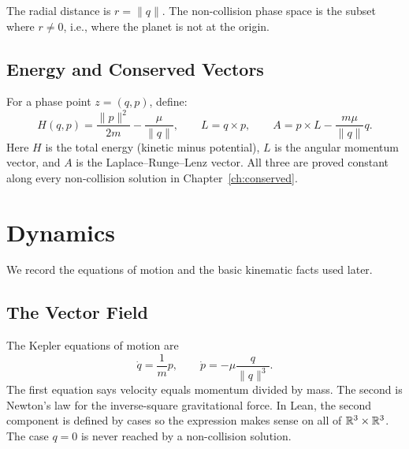 \begin{definition}\label{def:noncollision}
The radial distance is $r = \|q\|$.
The non-collision phase space is the subset where $r \neq 0$, i.e., where the planet is not at the origin.
\leanok
\end{definition}

\section{Energy and Conserved Vectors}

\begin{definition}\label{def:basic-observables}
For a phase point $z = (q, p)$, define:
\[
  H(q,p) = \frac{\|p\|^2}{2m} - \frac{\mu}{\|q\|},
  \qquad
  L = q \times p,
  \qquad
  A = p \times L - \frac{m\mu}{\|q\|}q.
\]
Here $H$ is the total energy (kinetic minus potential), $L$ is the angular momentum vector, and $A$ is the Laplace--Runge--Lenz vector.
All three are proved constant along every non-collision solution in Chapter~\ref{ch:conserved}.
\leanok
\end{definition}

\chapter{Dynamics}

We record the equations of motion and the basic kinematic facts used later.

\section{The Vector Field}

\begin{definition}\label{def:vector-field}
The Kepler equations of motion are
\[
  \dot q = \frac{1}{m}p,
  \qquad
  \dot p = -\mu\frac{q}{\|q\|^3}.
\]
The first equation says velocity equals momentum divided by mass.
The second is Newton's law for the inverse-square gravitational force.
In Lean, the second component is defined by cases so the expression makes sense on all of $\mathbb{R}^3 \times \mathbb{R}^3$.
The case $q = 0$ is never reached by a non-collision solution.
\leanok
\end{definition}

